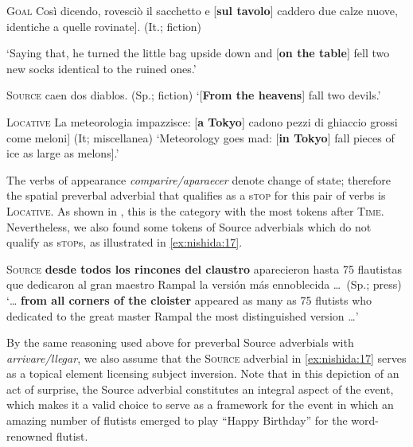 \documentclass[output=paper,colorlinks,citecolor=brown,
]{langscibook}
\begin{document}
\begin{exe}
    \ex\label{ex:nishida:14}
    \textsc{Goal} \quad	Così dicendo, rovesciò il sacchetto e [\textbf{sul tavolo}] caddero due calze nuove, 						identiche a quelle rovinate].	(It.; fiction)
    
    \glt `Saying that, he turned the little bag upside down and [\textbf{on the table}] fell two new socks identical to the ruined ones.'   
\end{exe}

\begin{exe}
    \ex\label{ex:nishida:15}
    \textsc{Source}  caen dos diablos.	(Sp.; fiction)
    \glt `[\textbf{From the heavens}] fall two devils.'
\end{exe}

\begin{exe}
    \ex\label{ex:nishida:16}
    \textsc{Locative} \quad La meteorologia impazzisce: [\textbf{a Tokyo}] cadono pezzi di ghiaccio grossi come meloni] (It; miscellanea)
    \glt `Meteorology goes mad: [\textbf{in Tokyo}] fall pieces of ice as large as melons].'    
\end{exe}

The verbs of appearance \textit{comparire/aparaecer} denote change of state; therefore the spatial preverbal adverbial that qualifies as a s\textsc{top} for this pair of verbs is \textsc{Locative}. As shown in , this is the category with the most tokens after \textsc{Time}. Nevertheless, we also found some tokens of Source adverbials which do not qualify as s\textsc{top}s, as illustrated in \ref{ex:nishida:17}. 



\begin{exe}
    \ex\label{ex:nishida:17}
    
    \textsc{Source} \quad	{\dots} \textbf{desde todos los rincones del claustro} aparecieron hasta 75
    flautistas que dedicaron al gran maestro Rampal la versión más ennoblecida {\dots}\
    (Sp.; press) 
    \glt `{\dots} \textbf{from all corners of the cloister} appeared as many as 75 	flutists who dedicated to the great master Rampal the most distinguished 	version {\dots}'  
\end{exe}

By the same reasoning used above for preverbal Source adverbials with \textit{arrivare/llegar}, we also assume that the \textsc{Source} adverbial in \ref{ex:nishida:17} serves as a topical element licensing subject inversion. Note that in this depiction of an act of surprise, the Source adverbial constitutes an integral aspect of the event, which makes it a valid choice to serve as a framework for the event in which an amazing number of flutists emerged to play ``Happy Birthday'' for the word-renowned flutist. 
\end{document}
